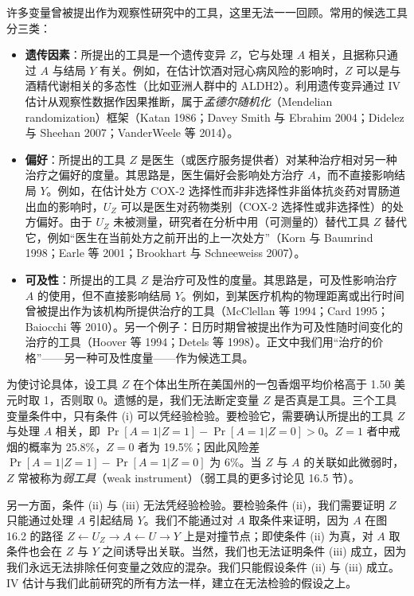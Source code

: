 \begin{finepoint}[观察性研究中的候选工具变量]
许多变量曾被提出作为观察性研究中的工具，这里无法一一回顾。常用的候选工具分三类：

\begin{itemize}[leftmargin=1.4em,itemsep=0.35em,topsep=0.3em]
\item \textbf{遗传因素}：所提出的工具是一个遗传变异 $Z$，它与处理 $A$ 相关，且据称只通过 $A$ 与结局 $Y$ 有关。例如，在估计饮酒对冠心病风险的影响时，$Z$ 可以是与酒精代谢相关的多态性（比如亚洲人群中的 ALDH2）。利用遗传变异通过 IV 估计从观察性数据作因果推断，属于\emph{孟德尔随机化}（Mendelian randomization）框架（Katan 1986；Davey Smith 与 Ebrahim 2004；Didelez 与 Sheehan 2007；VanderWeele 等 2014）。

\item \textbf{偏好}：所提出的工具 $Z$ 是医生（或医疗服务提供者）对某种治疗相对另一种治疗之偏好的度量。其思路是，医生偏好会影响处方治疗 $A$，而不直接影响结局 $Y$。例如，在估计处方 COX-2 选择性而非非选择性非甾体抗炎药对胃肠道出血的影响时，$U_Z$ 可以是医生对药物类别（COX-2 选择性或非选择性）的处方偏好。由于 $U_Z$ 未被测量，研究者在分析中用（可测量的）替代工具 $Z$ 替代它，例如“医生在当前处方之前开出的上一次处方”（Korn 与 Baumrind 1998；Earle 等 2001；Brookhart 与 Schneeweiss 2007）。

\item \textbf{可及性}：所提出的工具 $Z$ 是治疗可及性的度量。其思路是，可及性影响治疗 $A$ 的使用，但不直接影响结局 $Y$。例如，到某医疗机构的物理距离或出行时间曾被提出作为该机构所提供治疗的工具（McClellan 等 1994；Card 1995；Baiocchi 等 2010）。另一个例子：日历时期曾被提出作为可及性随时间变化的治疗的工具（Hoover 等 1994；Detels 等 1998）。正文中我们用“治疗的价格”——另一种可及性度量——作为候选工具。
\end{itemize}
\end{finepoint}

为使讨论具体，设工具 $Z$ 在个体出生所在美国州的一包香烟平均价格高于 1.50 美元时取 1，否则取 0。遗憾的是，我们无法断定变量 $Z$ 是否真是工具。三个工具变量条件中，只有条件 (i) 可以凭经验检验。要检验它，需要确认所提出的工具 $Z$ 与处理 $A$ 相关，即 $\Pr[A=1|Z=1]-\Pr[A=1|Z=0]>0$。$Z=1$ 者中戒烟的概率为 25.8\%，$Z=0$ 者为 19.5\%；因此风险差 $\Pr[A=1|Z=1]-\Pr[A=1|Z=0]$ 为 6\%。当 $Z$ 与 $A$ 的关联如此微弱时，$Z$ 常被称为\emph{弱工具}（weak instrument）（弱工具的更多讨论见 16.5 节）。

另一方面，条件 (ii) 与 (iii) 无法凭经验检验。要检验条件 (ii)，我们需要证明 $Z$ 只能通过处理 $A$ 引起结局 $Y$。我们不能通过对 $A$ 取条件来证明，因为 $A$ 在图 16.2 的路径 $Z\leftarrow U_Z\rightarrow A\leftarrow U\rightarrow Y$ 上是对撞节点；即使条件 (ii) 为真，对 $A$ 取条件也会在 $Z$ 与 $Y$ 之间诱导出关联。当然，我们也无法证明条件 (iii) 成立，因为我们永远无法排除任何变量之效应的混杂。我们只能假设条件 (ii) 与 (iii) 成立。IV 估计与我们此前研究的所有方法一样，建立在无法检验的假设之上。


